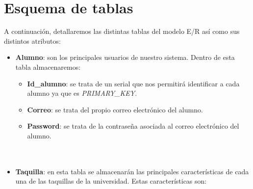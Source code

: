 \documentclass[12pt]{report}
\begin{document}
\section{Esquema de tablas}
A continuación, detallaremos las distintas tablas del modelo E/R así como sus distintos atributos:
\begin{itemize}
    \item\textbf{Alumno}: son los principales usuarios de nuestro sistema. Dentro de esta tabla almacenaremos:
    \begin{itemize}
        \item \textbf{Id\_alumno}: se trata de un serial que nos permitirá identificar a cada alumno ya que es \textit{PRIMARY\_KEY}.
        \item \textbf{Correo}: se trata del propio correo electrónico del alumno.
        \item \textbf{Password}: se trata de la contraseña asociada al correo electrónico del alumno.
        \\\\\\
    \end{itemize}
    
    \item\textbf{Taquilla}: en esta tabla se almacenarán las principales características de cada una de las taquillas de la universidad. Estas características son:
    

\end{itemize}
\end{document}

